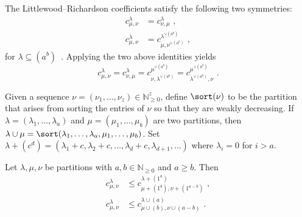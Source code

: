 The Littlewood--Richardson coefficients satisfy the following two symmetries:
\begin{align}
\label{eq:LRsymmetrybasic}
c_{\mu, \nu}^{\lambda} &= c_{\nu, \mu}^{\lambda}\,\, ,
\\ 
\label{eq:LRsymmetry-transpose}
c_{\mu, \nu}^{\lambda} &= c_{\mu, \nu^{\vee(a^b)}}^{\lambda^{\vee(a^b)}}\,\, ,
\end{align}
for $\lambda \subseteq (a^b)$~\cite{S99}. Applying the two above identities yields
\begin{equation}
\label{eq:LRsymmetry-rotate}
c^\lambda_{\mu,\nu} = c^\lambda_{\nu,\mu} = c^{\mu^{\vee(a^b)}}_{\nu, \lambda^{\vee(a^b)}} = c^{\mu^{\vee(a^b)}}_{\lambda^{\vee(a^b)}, \nu}\, \,.
\end{equation}

Given a sequence $\nu = (\nu_1,\ldots,\nu_z)\in \mathbb{N}_{\geq 0}^z$, define $\sort(\nu)$ to be the partition that arises from sorting the entries of $\nu$ so that they are weakly decreasing. If $\lambda = (\lambda_1,\ldots,\lambda_a)$ and $\mu = (\mu_1,\ldots,\mu_b)$ are two partitions, then $\lambda \cup \mu = \sort (\lambda_1,\ldots,\lambda_a,\mu_1,\ldots,\mu_b)$. Set $\lambda + (c^d) = (\lambda_1 + c, \lambda_2 + c,\ldots,\lambda_d + c, \lambda_{d+1}, \ldots)$ where $\lambda_i = 0$ for $i > a$.

\begin{theorem}[{\cite[Theorem 3.1]{G10}}] \label{theorem:gutReduction} Let $\lambda, \mu, \nu$ be partitions with $a,b \in \mathbb{N}_{\geq 0}$ and $a \geq b$. Then 
\begin{align}
\label{eq:LRsymmetryswap}
c_{\mu,\nu}^{\lambda} &\leq c_{\mu + (1^b),\nu + (1^{a-b})}^{\lambda + (1^a)}\, \, ,
\\
c_{\mu,\nu}^{\lambda} &\leq c_{\mu \cup (b),\nu \cup (a-b)}^{\lambda \cup (a)}\, \,.
\end{align}

\end{theorem}

